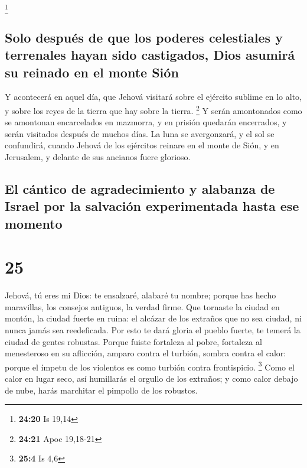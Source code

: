 \footnote{\textbf{24:20} Is 19,14}

\hypertarget{solo-despuuxe9s-de-que-los-poderes-celestiales-y-terrenales-hayan-sido-castigados-dios-asumiruxe1-su-reinado-en-el-monte-siuxf3n}{%
\subsection{Solo después de que los poderes celestiales y terrenales
hayan sido castigados, Dios asumirá su reinado en el monte
Sión}\label{solo-despuuxe9s-de-que-los-poderes-celestiales-y-terrenales-hayan-sido-castigados-dios-asumiruxe1-su-reinado-en-el-monte-siuxf3n}}

 Y acontecerá en aquel día, que Jehová visitará sobre el
ejército sublime en lo alto, y sobre los reyes de la tierra que hay
sobre la tierra. \footnote{\textbf{24:21} Apoc 19,18-21} 
Y serán amontonados como se amontonan encarcelados en mazmorra, y en
prisión quedarán encerrados, y serán visitados después de muchos días.
 La luna se avergonzará, y el sol se confundirá, cuando
Jehová de los ejércitos reinare en el monte de Sión, y en Jerusalem, y
delante de sus ancianos fuere glorioso.

\hypertarget{el-cuxe1ntico-de-agradecimiento-y-alabanza-de-israel-por-la-salvaciuxf3n-experimentada-hasta-ese-momento}{%
\subsection{El cántico de agradecimiento y alabanza de Israel por la
salvación experimentada hasta ese
momento}\label{el-cuxe1ntico-de-agradecimiento-y-alabanza-de-israel-por-la-salvaciuxf3n-experimentada-hasta-ese-momento}}

\hypertarget{section-24}{%
\section{25}\label{section-24}}

 Jehová, tú eres mi Dios: te ensalzaré, alabaré tu nombre;
porque has hecho maravillas, los consejos antiguos, la verdad firme.
 Que tornaste la ciudad en montón, la ciudad fuerte en
ruina: el alcázar de los extraños que no sea ciudad, ni nunca jamás sea
reedeficada.  Por esto te dará gloria el pueblo fuerte, te
temerá la ciudad de gentes robustas.  Porque fuiste
fortaleza al pobre, fortaleza al menesteroso en su aflicción, amparo
contra el turbión, sombra contra el calor: porque el ímpetu de los
violentos es como turbión contra frontispicio. \footnote{\textbf{25:4}
  Is 4,6}  Como el calor en lugar seco, así humillarás el
orgullo de los extraños; y como calor debajo de nube, harás marchitar el
pimpollo de los robustos.

